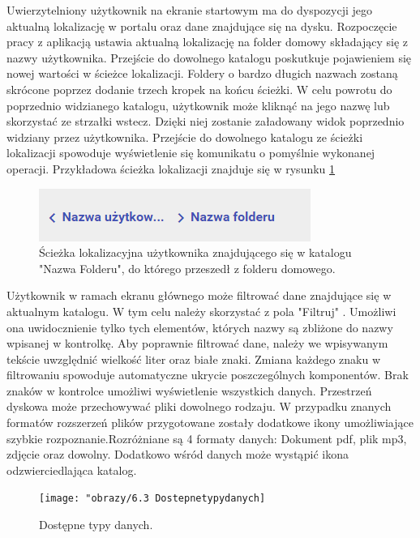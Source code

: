 Uwierzytelniony użytkownik na ekranie startowym ma do dyspozycji jego aktualną lokalizację w portalu oraz dane znajdujące się na dysku. Rozpoczęcie pracy z aplikacją ustawia aktualną lokalizację na folder domowy składający się z nazwy użytkownika. Przejście do dowolnego katalogu poskutkuje pojawieniem się nowej wartości w ścieżce lokalizacji. Foldery o bardzo długich nazwach zostaną skrócone poprzez dodanie trzech kropek na końcu ścieżki.  W celu powrotu do poprzednio widzianego katalogu, użytkownik może kliknąć na jego nazwę lub skorzystać ze strzałki wstecz. Dzięki niej zostanie załadowany widok poprzednio widziany przez użytkownika. Przejście do dowolnego katalogu ze ścieżki lokalizacji spowoduje wyświetlenie się komunikatu o pomyślnie wykonanej operacji. Przykładowa ścieżka lokalizacji znajduje się w rysunku \ref{fig:11}
\begin{figure}[!h]
	\centering
	\includegraphics[width=0.7\linewidth]{"obrazy/6..3 Lokalizacja"}
	\caption{Ścieżka lokalizacyjna użytkownika znajdującego się w katalogu "Nazwa Folderu", do którego przeszedł z folderu domowego. }
	\label{fig:11}
\end{figure}

Użytkownik w ramach ekranu głównego może filtrować dane znajdujące się w aktualnym katalogu. W tym celu należy skorzystać z pola "Filtruj" . Umożliwi ona uwidocznienie tylko tych elementów, których nazwy są zbliżone do nazwy wpisanej w kontrolkę. Aby poprawnie filtrować dane, należy we wpisywanym tekście uwzględnić wielkość liter oraz białe znaki. Zmiana każdego znaku w filtrowaniu spowoduje automatyczne ukrycie poszczególnych komponentów. Brak znaków w kontrolce umożliwi wyświetlenie wszystkich danych.
Przestrzeń dyskowa może przechowywać pliki dowolnego rodzaju. W przypadku znanych formatów rozszerzeń plików przygotowane zostały dodatkowe ikony umożliwiające szybkie rozpoznanie.Rozróżniane są 4 formaty danych: Dokument pdf, plik mp3, zdjęcie oraz dowolny. Dodatkowo wśród danych może wystąpić ikona odzwierciedlająca katalog. 

\begin{figure}[!h]
	\centering
	\texttt{[image: "obrazy/6.3 Dostepnetypydanych]}
	\caption{Dostępne typy danych.}
	\label{datatypes}
\end{figure}


